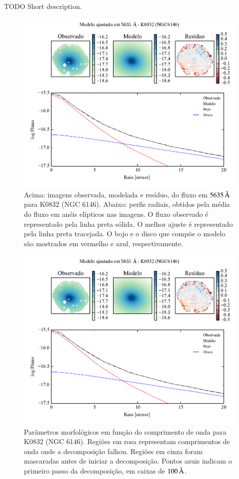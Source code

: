 TODO Short description.

\begin{figure}
	\includegraphics[page=1]{figuras-decomp/K0832_sample006a}
	\caption[Ajuste morfológico em $5635\,\angstrom$ de K0832 (NGC 6146)]
	{Acima: imagens observada, modelada e resíduo, do fluxo em $5635\,\angstrom$
	para K0832 (NGC 6146). Abaixo: perfis radiais, obtidos pela média do fluxo em
	anéis elípticos nas imagens. O fluxo observado é representado pela linha preta
	sólida. O melhor ajuste é representado pela linha preta tracejada. O bojo e o
	disco que compõe o modelo são mostrados em vermelho e azul, respectivamente.}
	\label{fig:decompRadprof:K0832}
\end{figure}

\begin{figure}
	\includegraphics[page=2]{figuras-decomp/K0832_sample006a}
	\caption[Parâmetros morfológicos em função do comprimento de onda de K0832
	(NGC 6146)]
	{Parâmetros morfológicos em função do comprimento de onda para
	K0832 (NGC 6146). Regiões em rosa representam comprimentos de onda onde a
	decomposição falhou. Regiões em cinza foram mascaradas antes de iniciar a
	decomposição. Pontos azuis indicam o primeiro passo da decomposição, em caixas
	de $100\,\text{\normalfont\AA}$.}
	\label{fig:decompParams:K0832}
\end{figure}


